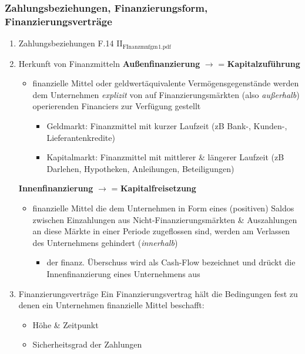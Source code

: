 \documentclass[11pt]{article}
\begin{document}
\subsubsection{Zahlungsbeziehungen, Finanzierungsform, Finanzierungsverträge}
\label{sec:org9e15863}
\begin{enumerate}
\item Zahlungsbeziehungen
\label{sec:org2fe2e36}
F.14 II\(_{\text{FInanzmnfgm}}\)\(_{\text{1.pdf}}\)
\item Herkunft von Finanzmitteln
\label{sec:org23a87da}
\textbf{Außenfinanzierung} \(\rightarrow\) = \textbf{Kapitalzuführung}
\begin{itemize}
\item finanzielle Mittel oder geldwertäquivalente Vermögensgegenstände werden dem Unternehmen \emph{explizit} von auf Finanzierungsmärkten (also \emph{außerhalb}) operierenden Financiers zur Verfügung gestellt
\begin{itemize}
\item Geldmarkt: Finanzmittel mit kurzer Laufzeit (zB Bank-, Kunden-, Lieferantenkredite)
\item Kapitalmarkt: Finanzmittel mit mittlerer \& längerer Laufzeit (zB Darlehen, Hypotheken, Anleihungen, Beteiligungen)
\end{itemize}
\end{itemize}

\textbf{Innenfinanzierung} \(\rightarrow\) = \textbf{Kapitalfreisetzung}
\begin{itemize}
\item finanzielle Mittel die dem Unternehmen in Form eines (positiven) Saldos zwischen Einzahlungen aus Nicht-Finanzierungsmärkten \& Auszahlungen an diese Märkte in einer Periode zugeflossen sind, werden am Verlassen des Unternehmens gehindert (\emph{innerhalb})
\begin{itemize}
\item der finanz. Überschuss wird als Cash-Flow bezeichnet und drückt die Innenfinanzierung eines Unternehmens aus
\end{itemize}
\end{itemize}
\item Finanzierungsverträge
\label{sec:orgb5bf5fd}
Ein Finanzierungsvertrag hält die Bedingungen fest zu denen ein Unternehmen finanzielle Mittel beschafft:
\begin{itemize}
\item Höhe \& Zeitpunkt
\item Sicherheitsgrad der Zahlungen
\end{itemize}


\end{enumerate}
\end{document}
